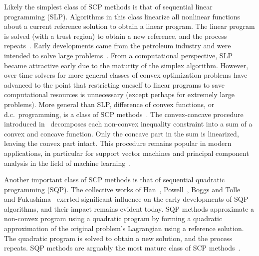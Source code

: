 \documentclass[letterpaper, 10 pt, conference]{ieeeconf}
\begin{document}

Likely the simplest class of SCP methods is that of sequential linear programming (SLP). Algorithms in this class linearize all nonlinear functions about a current reference solution to obtain a linear program. The linear program is solved (with a trust region) to obtain a new reference, and the process repeats~\cite{Byrd2004}. Early developments came from the petroleum industry and were intended to solve large problems~\cite{Palacios-Gomez1982}. From a computational perspective, SLP became attractive early due to the maturity of the simplex algorithm. However, over time solvers for more general classes of convex optimization problems have advanced to the point that restricting oneself to linear programs to save computational resources is unnecessary (except perhaps for extremely large problems).  More general than SLP, difference of convex functions, or d.c.~programming, is a class of SCP methods~\cite{Horst1999}. The convex-concave procedure introduced in~\cite{Yuille2002} decomposes each non-convex inequality constraint into a sum of a convex and concave function. Only the concave part in the sum is linearized, leaving the convex part intact. This procedure remains popular in modern applications, in particular for support vector machines and principal component analysis in the field of machine learning~\cite{Lanckriet2009}. 

Another important class of SCP methods is that of sequential quadratic programming (SQP). The collective works of Han~\cite{Han1977}, Powell~\cite{Powell1978a,Powell1986}, Boggs and Tolle~\cite{Boggs1982,Boggs1989,Boggs1996} and Fukushima~\cite{Fukushima1986} exerted significant influence on the early developments of SQP algorithms, and their impact remains evident today. SQP methods approximate a non-convex program using a quadratic program by forming a quadratic approximation of the original problem's Lagrangian using a reference solution. The quadratic program is solved to obtain a new solution, and the process repeats. SQP methods are arguably the most mature class of SCP methods~\cite{Gill2005,Betts1993}.
\end{document}
